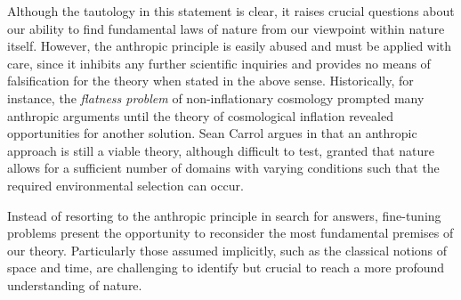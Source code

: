 Although the tautology in this statement is clear, it raises crucial questions about our ability to find fundamental laws of nature from our viewpoint within nature itself. However, the anthropic principle is easily abused and must be applied with care, since it inhibits any further scientific inquiries and provides no means of falsification for the theory when stated in the above sense. Historically, for instance, the \emph{flatness problem} of non-inflationary cosmology prompted many anthropic arguments until the theory of cosmological inflation revealed opportunities for another solution. Sean Carrol argues in \autocite{Carroll2003} that an anthropic approach is still a viable theory, although difficult to test, granted that nature allows for a sufficient number of domains with varying conditions such that the required environmental selection can occur.

Instead of resorting to the anthropic principle in search for answers, fine-tuning problems present the opportunity to reconsider the most fundamental premises of our theory. Particularly those assumed implicitly, such as the classical notions of space and time, are challenging to identify but crucial to reach a more profound understanding of nature.
